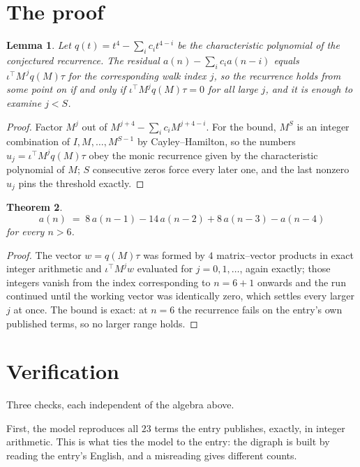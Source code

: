 \documentclass[11pt,a4paper]{article}
\theoremstyle{plain}
\newtheorem{theorem}{Theorem}
\newtheorem{lemma}[theorem]{Lemma}
\theoremstyle{definition}
\begin{document}
\section{The proof}

\begin{lemma}\label{lem:crit}
Let $q(t)=t^{4}-\sum_i c_it^{4-i}$ be the characteristic polynomial of the
conjectured recurrence. The residual $a(n)-\sum_ic_ia(n-i)$ equals
$\iota^{\!\top}M^{\,j}q(M)\tau$ for the corresponding walk index $j$, so the recurrence
holds from some point on if and only if $\iota^{\!\top}M^{j}q(M)\tau=0$ for all large $j$,
and it is enough to examine $j<S$.
\end{lemma}

\begin{proof}
Factor $M^{j}$ out of $M^{j+4}-\sum_ic_iM^{j+4-i}$. For the bound, $M^{S}$
is an integer combination of $I,M,\dots,M^{S-1}$ by Cayley--Hamilton, so the numbers
$u_j=\iota^{\!\top}M^{j}q(M)\tau$ obey the monic recurrence given by the characteristic
polynomial of $M$; $S$ consecutive zeros force every later one, and the last nonzero $u_j$
pins the threshold exactly.
\end{proof}

\begin{theorem}
\[
a(n)\;=\;8\,a(n-1) - 14\,a(n-2) + 8\,a(n-3) - a(n-4)
\]
for every $n>6$.
\end{theorem}

\begin{proof}
The vector $w=q(M)\tau$ was formed by $4$ matrix--vector products in exact integer
arithmetic and $\iota^{\!\top}M^{j}w$ evaluated for $j=0,1,\dots$, again exactly; those
integers vanish from the index corresponding to $n=6+1$ onwards and the run continued
until the working vector was identically zero, which settles every larger $j$ at once. The bound is exact: at $n=6$ the recurrence fails on the entry's own published terms, so no larger range holds.
\end{proof}

\section{Verification}

Three checks, each independent of the algebra above.

First, the model reproduces all $23$ terms the entry publishes, exactly, in integer
arithmetic. This is what ties the model to the entry: the digraph is built by reading the
entry's English, and a misreading gives different counts.
\end{document}
